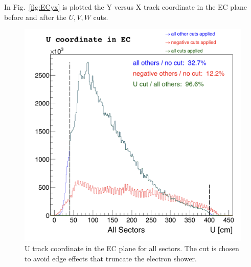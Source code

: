 In Fig.~\ref{fig:ECyx} is plotted the Y versus X track coordinate in the EC plane before and after
the $U,V,W$ cuts.



\clearpage
\begin{figure}[ht]
  \centering
		\includegraphics[width=0.7\textheight]{img/cut-06ECU_sector-all.png}
		\caption{U track coordinate in the EC plane for all sectors. The cut is chosen to avoid
              edge effects that truncate the electron shower.}
 		\label{fig:ECu}
\end{figure}
\clearpage

